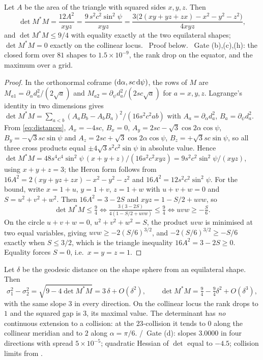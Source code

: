 \begin{theorem}\label{thm:shape-det}
Let $A$ be the area of the triangle with squared sides $x,y,z$. Then
\begin{equation}\label{eq:det}
   \det M^*M=\frac{12A^2}{xyz}=\frac{9\,s^2c^2\sin^2\psi}{xyz}
   =\frac{3\bigl(2(xy+yz+zx)-x^2-y^2-z^2\bigr)}{4xyz},
\end{equation}
and $\det M^*M\le 9/4$ with equality exactly at the two equilateral shapes; $\det M^*M=0$ exactly
on the collinear locus.
\T\ Proof below. \V\ Gate  (b),(c),(h): the closed form over $81$
shapes to $1.5\times10^{-9}$, the rank drop on the equator, and the maximum over a grid.
\end{theorem}

\begin{proof}
In the orthonormal coframe $(\mathrm{d}\alpha,sc\,\mathrm{d}\psi)$, the rows of $M$ are
$M_{a1}=\partial_\alpha d_a^2/(2\sqrt a)$ and $M_{a2}=\partial_\psi d_a^2/(2sc\sqrt a)$ for
$a=x,y,z$. Lagrange's identity in two dimensions gives
$\det M^*M=\sum_{a<b}(A_aB_b-A_bB_a)^2/(16s^2c^2ab)$ with $A_a=\partial_\alpha d_a^2$,
$B_a=\partial_\psi d_a^2$. From \eqref{eq:distances}, $A_x=-4sc$, $B_x=0$,
$A_y=2sc-\sqrt3\cos2\alpha\cos\psi$, $B_y=-\sqrt3sc\sin\psi$ and $A_z=2sc+\sqrt3\cos2\alpha\cos\psi$,
$B_z=+\sqrt3sc\sin\psi$, so all three cross products equal $\pm4\sqrt3s^2c^2\sin\psi$ in absolute
value. Hence $\det M^*M=48s^4c^4\sin^2\psi\,(x+y+z)/(16s^2c^2xyz)=9s^2c^2\sin^2\psi/(xyz)$, using
$x+y+z=3$; the Heron form follows from $16A^2=2(xy+yz+zx)-x^2-y^2-z^2$ and
$16A^2=12s^2c^2\sin^2\psi$.
For the bound, write $x=1+u$, $y=1+v$, $z=1+w$ with $u+v+w=0$ and $S=u^2+v^2+w^2$. Then
$16A^2=3-2S$ and $xyz=1-S/2+uvw$, so
\[
   \det M^*M\le\tfrac94 \iff \tfrac{3(3-2S)}{4(1-S/2+uvw)}\le\tfrac94 \iff uvw\ge-\tfrac{S}{6}.
\]
On the circle $u+v+w=0$, $u^2+v^2+w^2=S$, the product $uvw$ is minimised at two equal
variables, giving $uvw\ge-2(S/6)^{3/2}$, and $-2(S/6)^{3/2}\ge-S/6$ exactly when $S\le3/2$,
which is the triangle inequality $16A^2=3-2S\ge0$. Equality forces $S=0$, i.e.\ $x=y=z=1$.
\end{proof}

\begin{theorem}\label{thm:cone}
Let $\delta$ be the geodesic distance on the shape sphere from an equilateral shape. Then
\begin{equation}\label{eq:cone}
   \sigma_1^2-\sigma_2^2=\sqrt{9-4\det M^*M}=3\,\delta+O(\delta^2),
   \qquad \det M^*M=\tfrac94-\tfrac94\delta^2+O(\delta^3),
\end{equation}
with the same slope $3$ in every direction. On the collinear locus the rank drops to $1$ and the
squared gap is $3$, its maximal value. The determinant has \emph{no} continuous extension to a
collision: at the $23$-collision it tends to $0$ along the collinear meridian and to $2$ along
$\alpha=\pi/6$.
\T/\V\ Gate  (d): slopes $3.0000$ in four directions with spread
$5\times10^{-5}$; quadratic Hessian of $\det$ equal to $-4.5$; collision limits from
.
\end{theorem}

